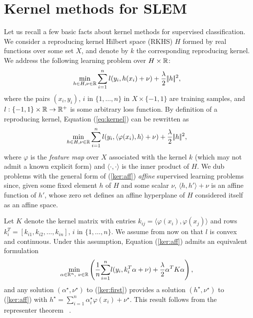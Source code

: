 \section{Kernel methods for SLEM}
Let us recall a few basic facts about kernel methods for supervised
classification. We consider a reproducing kernel Hilbert space (RKHS)
$H$ formed by real functions over some set
$X$, and denote by $k$ the corresponding reproducing kernel.  We
address the following learning problem over $H\times\mathbb R$:
\begin{equation}
\min_{h\in H,\nu\in\mathbb R}
\sum_{i=1}^n l(y_i,h(x_i)+\nu) + \frac{\lambda}{2}|\! |h|\!|^2,
\label{eq:kernel}
\end{equation}  
where the pairs $(x_i,y_i)$, $i$ in $\{1,\ldots,n\}$ in $X\times \{-1,1\}$ are training samples, and $l: \{-1,1\}\times \mathbb R\rightarrow\mathbb R^+$ is some arbitrary loss function. 
By definition of a reproducing kernel,
Equation (\ref{eq:kernel}) can be rewritten as
\begin{equation}
\min_{h\in H,\nu\in\mathbb R}
\sum_{i=1}^n l(y_i,\langle \varphi(x_i),h\rangle+\nu) +
\dfrac{\lambda}{2}|\!|h|\!|^2,
\label{ker:aff}
\end{equation} 
where $\varphi$ is the {\em feature map} over $X$ associated with the
kernel $k$ (which may not admit a known explicit form) and $\langle \cdot, \cdot \rangle$ is the inner product of $H$. We dub problems with the general form of (\ref{ker:aff}) {\em affine}
supervised learning problems since, given some fixed element $h$ of
$H$ and some scalar $\nu$, $\langle h,h'\rangle+\nu$ is an affine function of $h'$,
whose zero set defines an affine hyperplane of $H$ considered itself
as an affine space.

Let $K$ denote the kernel matrix with entries $k_{ij}=\langle\varphi(x_i),
\varphi(x_j)\rangle$ and rows $k_i^T=[k_{i1}, k_{i2},...,k_{in}]$, $i$ in $\{1,\ldots,n\}$.  We assume from now on that $l$ is convex and continuous. Under this assumption, Equation (\ref{ker:aff}) admits an equivalent formulation
\begin{align}
\min_{\alpha\in\mathbb R^{n}, \ \nu\in\mathbb R} \left(\dfrac{1}{n}\displaystyle{\sum_{i=1}^n} l(y_i, k_i^T\alpha+\nu)  +\dfrac{\lambda}{2}\alpha^TK\alpha\right), \label{ker:first}
\end{align}
and any solution $(\alpha^\star,\nu^\star)$ to (\ref{ker:first})
provides
a solution $(h^\star,\nu^\star)$ to (\ref{ker:aff}) with
$h^\star=\sum_{i=1}^n \alpha_i^\star\varphi(x_i)+\nu^\star$. This result follows from the representer theorem
~\cite{SHS01,Wahba90}.


